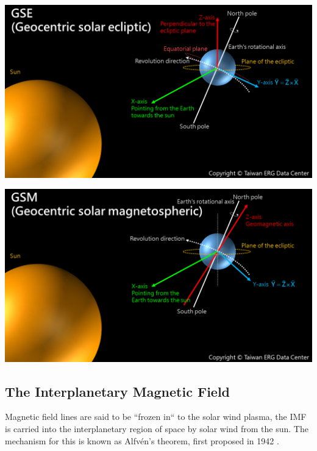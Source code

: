 \documentclass[12pt]{article}
\newenvironment{Figure}
  {\par\medskip\noindent\minipage{\linewidth}}
  {\endminipage\par\medskip}
\begin{document}
\begin{Figure}
    \begin{minipage}[c]{0.48\textwidth}
        \centering
        \includegraphics[width=\textwidth]{GSE.png}
    \end{minipage}
    \begin{minipage}[c]{0.48\textwidth}
        \centering
        \includegraphics[width=\textwidth]{GSM.png}
    \end{minipage}
\end{Figure}

\subsection{The Interplanetary Magnetic Field}
Magnetic field lines are said to be ``frozen in`` to the solar wind plasma, the IMF is carried into the interplanetary region of space by solar wind from the sun. The mechanism for this is known as Alfvén's theorem, first proposed in 1942 \cite{alfven_1942}. 
\end{document}
